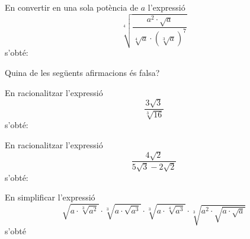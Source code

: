 \begin{enumerate}
\pregunta En convertir en una sola potència de $a$ l’expressió%
\[
\sqrt[4]{\frac{a^{2}\cdot \sqrt{a}}{\sqrt[4]{a}\cdot \left( \sqrt[3]{a}%
\right) ^{7}}}
\]%
s’obté:

\begin{enumerate}
\end{enumerate}
\feedback


\pregunta Quina de les següents afirmacions és falsa?

\begin{enumerate}
\end{enumerate}
\feedback


\pregunta En racionalitzar l’expressió
\[
\frac{3\sqrt{3}}{\sqrt[3]{16}}
\]%
s’obté:

\begin{enumerate}
\end{enumerate}
\feedback


\pregunta En racionalitzar l’expressió%
\[
\frac{4\sqrt{2}}{5\sqrt{3}-2\sqrt{2}}
\]%
s’obté:

\begin{enumerate}
\end{enumerate}
\feedback


\pregunta En simplificar l’expressió%
\[
\sqrt{a\cdot \sqrt[3]{a^{2}}}\cdot \sqrt[3]{a\cdot \sqrt{a^{3}}}\cdot \sqrt[3%
]{a\cdot \sqrt[4]{a^{3}}}\cdot \sqrt[3]{a^{2}\cdot \sqrt{a\cdot \sqrt{a}}}
\]%
s’obté

\begin{enumerate}
\end{enumerate}
\feedback

\end{enumerate}